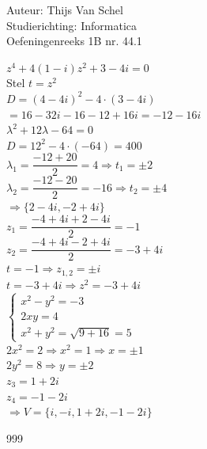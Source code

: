 \documentclass[a4paper]{article}
\begin{document}
  
\noindent \large Auteur: Thijs Van Schel \\
\noindent \large Studierichting: Informatica\\
\noindent \large Oefeningenreeks 1B nr. 44.1\\

\medskip

\normalsize

$z^4 + 4(1-i)z^2 + 3 - 4i = 0$\\

Stel $t = z^2$\\

$D= (4-4i)^2 - 4\cdot (3-4i)$\\

$= 16-32i-16-12+16i = -12-16i$\\

$\lambda^2 + 12\lambda - 64 = 0$\\

$D = 12^2-4\cdot (-64) = 400$\\

$\lambda_1 = \dfrac{-12+20}{2} = 4 \Rightarrow t_1 = \pm2$\\

$\lambda_2 = \dfrac{-12-20}{2} = -16 \Rightarrow t_2 = \pm4$\\

$\Rightarrow \{2-4i, -2+4i\}$\\

$z_1 = \dfrac{-4+4i+2-4i}{2} = -1$\\

$z_2 = \dfrac{-4+4i-2+4i}{2} = -3+4i$\\

$t = -1 \Rightarrow z_{1,2} = \pm i$\\

$t = -3+4i \Rightarrow z^2 = -3+4i$\\

$\left\{
\begin{array}{l}
x^2-y^2=-3 \\
2xy = 4 \\
x^2+y^2 = \sqrt{9+16} = 5
\end{array}
\right.$\\

$2x^2 = 2 \Rightarrow x^2=1 \Rightarrow x = \pm 1$\\

$2y^2 = 8 \Rightarrow y = \pm 2$\\

$z_3 = 1+2i$\\

$z_4 = -1-2i$\\

$\Rightarrow V = \{i,-i,1+2i,-1-2i\}$

\begin{thebibliography}{999}
\end{thebibliography}
\end{document}
